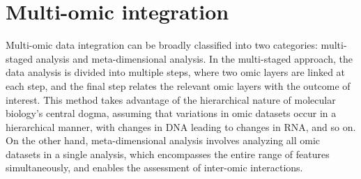 \documentclass[
]{book}
\newenvironment{Shaded}{\begin{snugshade}}{\end{snugshade}}
\newcommand{\AttributeTok}[1]{\textcolor[rgb]{0.77,0.63,0.00}{#1}}
\newcommand{\CommentTok}[1]{\textcolor[rgb]{0.56,0.35,0.01}{\textit{#1}}}
\newcommand{\DecValTok}[1]{\textcolor[rgb]{0.00,0.00,0.81}{#1}}
\newcommand{\FloatTok}[1]{\textcolor[rgb]{0.00,0.00,0.81}{#1}}
\newcommand{\FunctionTok}[1]{\textcolor[rgb]{0.00,0.00,0.00}{#1}}
\newcommand{\NormalTok}[1]{#1}
\newcommand{\OtherTok}[1]{\textcolor[rgb]{0.56,0.35,0.01}{#1}}
\newcommand{\SpecialCharTok}[1]{\textcolor[rgb]{0.00,0.00,0.00}{#1}}
\newcommand{\StringTok}[1]{\textcolor[rgb]{0.31,0.60,0.02}{#1}}
\begin{document}
\begin{Shaded}
\end{Shaded}

\normalsize

\hypertarget{multi-omic-integration}{%
\chapter{Multi-omic integration}\label{multi-omic-integration}}

Multi-omic data integration can be broadly classified into two categories: multi-staged analysis and meta-dimensional analysis. In the multi-staged approach, the data analysis is divided into multiple steps, where two omic layers are linked at each step, and the final step relates the relevant omic layers with the outcome of interest. This method takes advantage of the hierarchical nature of molecular biology's central dogma, assuming that variations in omic datasets occur in a hierarchical manner, with changes in DNA leading to changes in RNA, and so on. On the other hand, meta-dimensional analysis involves analyzing all omic datasets in a single analysis, which encompasses the entire range of features simultaneously, and enables the assessment of inter-omic interactions.
\end{document}
